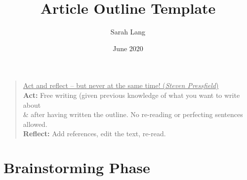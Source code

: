 \documentclass{article}
\title{Article Outline Template}
\author{Sarah Lang}
\date{June 2020}
\begin{document}
\pagestyle{pagenumbering}


\begin{quote}
    \underline{Act and reflect -- but never at the same time! (\emph{Steven Pressfield})} \\[0.5em]
    \textbf{Act:} Free writing (given previous knowledge of what you want to write about \\
    \& after having written the outline. No re-reading or perfecting sentences allowed.\\
    \textbf{Reflect:} Add references, edit the text, re-read. 
\end{quote}

\section{Brainstorming Phase}
\end{document}

